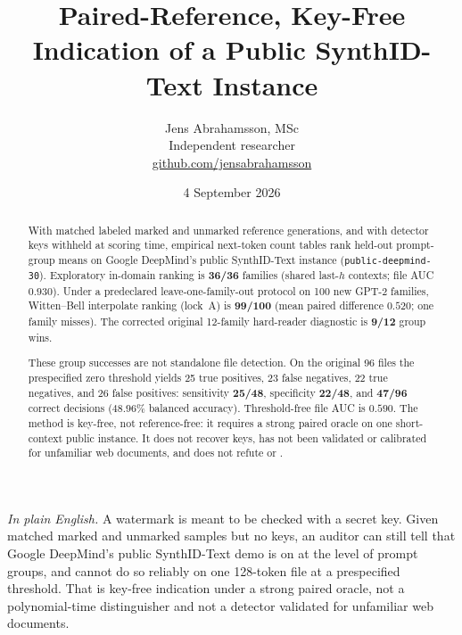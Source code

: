\documentclass[11pt,a4paper]{article}
\title{\texorpdfstring{\textbf{Paired-Reference, Key-Free Indication of a Public SynthID-Text Instance}}{Paired-Reference, Key-Free Indication of a Public SynthID-Text Instance}}
\author{
    Jens Abrahamsson, MSc \\
    Independent researcher \\
    \href{https://github.com/jensabrahamsson}{github.com/jensabrahamsson}
}
\date{4 September 2026}
\theoremstyle{definition}
\begin{document}
\frenchspacing
\maketitle

\vspace{0.6em}

\noindent\textit{In plain English.}
A watermark is meant to be checked with a secret key. Given matched
marked and unmarked samples but no keys, an auditor can still tell that
Google DeepMind's public SynthID-Text demo is on at the level of prompt
groups, and cannot do so reliably on one 128-token file at a prespecified
threshold. That is key-free indication under a strong paired oracle, not
a polynomial-time distinguisher and not a detector validated for
unfamiliar web documents.

\begin{abstract}
With matched labeled marked and unmarked reference generations, and with
detector keys withheld at scoring time, empirical next-token count tables
rank held-out prompt-group means on Google DeepMind's public SynthID-Text
instance (\texttt{public-deepmind-30}). Exploratory in-domain ranking is
\textbf{36/36} families (shared last-$h$ contexts; file AUC $0.930$).
Under a predeclared leave-one-family-out protocol on 100 new GPT-2
families, Witten--Bell interpolate ranking (lock~A) is \textbf{99/100}
(mean paired difference $0.520$; one family misses). The corrected original 12-family
hard-reader diagnostic is \textbf{9/12} group wins.

These group successes are not standalone file detection. On the original
96 files the prespecified zero threshold yields 25 true positives, 23 false
negatives, 22 true negatives, and 26 false positives: sensitivity
\textbf{25/48}, specificity \textbf{22/48}, and
\textbf{47/96} correct decisions ($48.96\%$ balanced accuracy).
Threshold-free file AUC is $0.590$. The method is key-free, not
reference-free: it requires a strong paired oracle on one short-context
public instance. It does not recover keys, has not been validated or
calibrated for unfamiliar web documents, and does not refute
\citet{christ2024undetectable} or \citet{zhang2024sand}.
\end{abstract}
\end{document}

